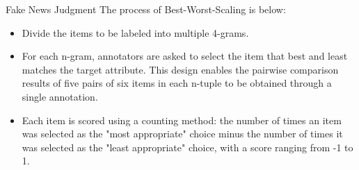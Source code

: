\documentclass[10pt]{beamer}
\begin{document}
\begin{frame}{Fake News Judgment}
The process of Best-Worst-Scaling is below:
\begin{itemize}
    \item Divide the items to be labeled into multiple 4-grams.
    \item For each n-gram, annotators are asked to select the item that best and least matches the target attribute. This design enables the pairwise comparison results of five pairs of six items in each n-tuple to be obtained through a single annotation.
    \item Each item is scored using a counting method: the number of times an item was selected as the "most appropriate" choice minus the number of times it was selected as the "least appropriate" choice, with a score ranging from -1 to 1.
\end{itemize}
\end{frame}
\end{document}
